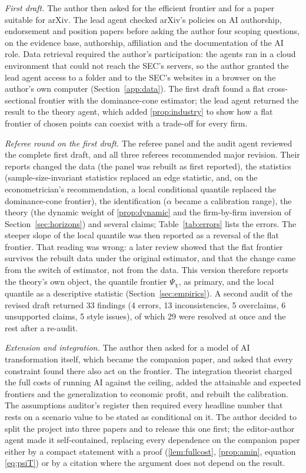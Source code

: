 \emph{First draft.} The author then asked for the efficient frontier and for a paper suitable for arXiv. The lead agent checked arXiv's policies on AI authorship, endorsement and position papers before asking the author four scoping questions, on the evidence base, authorship, affiliation and the documentation of the AI role. Data retrieval required the author's participation: the agents ran in a cloud environment that could not reach the SEC's servers, so the author granted the lead agent access to a folder and to the SEC's websites in a browser on the author's own computer (Section~\ref{app:data}). The first draft found a flat cross-sectional frontier with the dominance-cone estimator; the lead agent returned the result to the theory agent, which added \autoref{prop:industry} to show how a flat frontier of chosen points can coexist with a trade-off for every firm.

\emph{Referee round on the first draft.} The referee panel and the audit agent reviewed the complete first draft, and all three referees recommended major revision. Their reports changed the data (the panel was rebuilt as first reported), the statistics (sample-size-invariant statistics replaced an edge statistic, and, on the econometrician's recommendation, a local conditional quantile replaced the dominance-cone frontier), the identification ($\alpha$ became a calibration range), the theory (the dynamic weight of \autoref{prop:dynamic} and the firm-by-firm inversion of Section~\ref{sec:horizons}) and several claims; Table~\ref{tab:errors} lists the errors. The steeper slope of the local quantile was then reported as a reversal of the flat frontier. That reading was wrong: a later review showed that the flat frontier survives the rebuilt data under the original estimator, and that the change came from the switch of estimator, not from the data. This version therefore reports the theory's own object, the quantile frontier $\Psi_\chi$, as primary, and the local quantile as a descriptive statistic (Section~\ref{sec:empirics}). A second audit of the revised draft returned 33 findings (4 errors, 13 inconsistencies, 5 overclaims, 6 unsupported claims, 5 style issues), of which 29 were resolved at once and the rest after a re-audit.

\emph{Extension and integration.} The author then asked for a model of AI transformation itself, which became the companion paper, and asked that every constraint found there also act on the frontier. The integration theorist charged the full costs of running AI against the ceiling, added the attainable and expected frontiers and the generalization to economic profit, and rebuilt the calibration. The assumptions auditor's register then required every headline number that rests on a scenario value to be stated as conditional on it. The author decided to split the project into three papers and to release this one first; the editor-author agent made it self-contained, replacing every dependence on the companion paper either by a compact statement with a proof (\autoref{lem:fullcost}, \autoref{prop:amin}, equation \eqref{eq:psiT}) or by a citation where the argument does not depend on the result.

